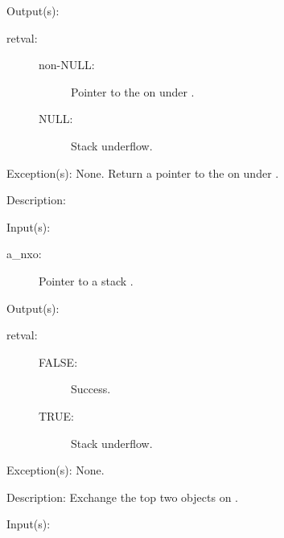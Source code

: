 \begin{capi}
\begin{capilist}
	\item[Output(s): ]
		\begin{description}\item[]
		\item[retval: ]
			\begin{description}\item[]
			\item[non-NULL: ]
				Pointer to the  on  under
				.
			\item[NULL: ]
				Stack underflow.
			\end{description}
		\end{description}
	\item[Exception(s): ] None.
		Return a pointer to the  on  under
		.
	\item[Description: ]
	\end{capilist}
\label{nxo_stack_exch}
	\begin{capilist}
	\item[Input(s): ]
		\begin{description}\item[]
		\item[a\_nxo: ]
			Pointer to a stack .
		\end{description}
	\item[Output(s): ]
		\begin{description}\item[]
		\item[retval: ]
			\begin{description}\item[]
			\item[FALSE: ]
				Success.
			\item[TRUE: ]
				Stack underflow.
			\end{description}
		\end{description}
	\item[Exception(s): ] None.
	\item[Description: ]
		Exchange the top two objects on .
	\end{capilist}
\label{nxo_stack_rool}
	\begin{capilist}
	\item[Input(s): ]

\end{capilist}
\end{capi}
